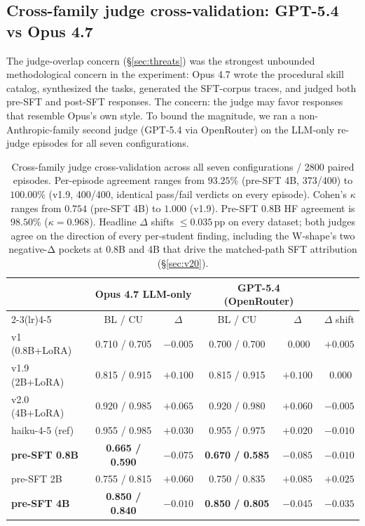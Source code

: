 \documentclass[10pt]{article}
\begin{document}
\subsection{Cross-family judge cross-validation: GPT-5.4 vs Opus 4.7}\label{sec:cross-family}

The judge-overlap concern (\S\ref{sec:threats}) was the strongest unbounded methodological concern in the experiment: Opus 4.7 wrote the procedural skill catalog, synthesized the tasks, generated the SFT-corpus traces, and judged both pre-SFT and post-SFT responses. The concern: the judge may favor responses that resemble Opus's own style. To bound the magnitude, we ran a non-Anthropic-family second judge (GPT-5.4 via OpenRouter) on the LLM-only re-judge episodes for all seven configurations.

\begin{table}[h]
\centering
\small
\begin{tabular}{@{}l c c c c c@{}}
\toprule
& \multicolumn{2}{c}{\textbf{Opus 4.7 LLM-only}} & \multicolumn{2}{c}{\textbf{GPT-5.4 (OpenRouter)}} & \\
\cmidrule(lr){2-3}\cmidrule(lr){4-5}
& BL / CU & $\Delta$ & BL / CU & $\Delta$ & $\Delta$ shift \\
\midrule
v1   (0.8B+LoRA)        & 0.710 / 0.705 & $-0.005$ & 0.700 / 0.700 & $\;0.000$ & $+0.005$ \\
v1.9 (2B+LoRA)          & 0.815 / 0.915 & $+0.100$ & 0.815 / 0.915 & $+0.100$ & $\;0.000$ \\
v2.0 (4B+LoRA)          & 0.920 / 0.985 & $+0.065$ & 0.920 / 0.980 & $+0.060$ & $-0.005$ \\
haiku-4-5 (ref)         & 0.955 / 0.985 & $+0.030$ & 0.955 / 0.975 & $+0.020$ & $-0.010$ \\
\textbf{pre-SFT 0.8B}   & \textbf{0.665 / 0.590} & $\boldsymbol{-0.075}$ & \textbf{0.670 / 0.585} & $\boldsymbol{-0.085}$ & $-0.010$ \\
pre-SFT 2B              & 0.755 / 0.815 & $+0.060$ & 0.750 / 0.835 & $+0.085$ & $+0.025$ \\
\textbf{pre-SFT 4B}     & \textbf{0.850 / 0.840} & $\boldsymbol{-0.010}$ & \textbf{0.850 / 0.805} & $\boldsymbol{-0.045}$ & $\boldsymbol{-0.035}$ \\
\bottomrule
\end{tabular}
\caption{Cross-family judge cross-validation across all seven configurations / 2800 paired episodes. Per-episode agreement ranges from $93.25\%$ (pre-SFT 4B, 373/400) to $100.00\%$ (v1.9, 400/400, identical pass/fail verdicts on every episode). Cohen's $\kappa$ ranges from $0.754$ (pre-SFT 4B) to $1.000$ (v1.9). Pre-SFT 0.8B HF agreement is $98.50\%$ ($\kappa{=}0.968$). Headline $\Delta$ shifts $\leq 0.035$\,pp on every dataset; both judges agree on the direction of every per-student finding, including the W-shape's two negative-Δ pockets at 0.8B and 4B that drive the matched-path SFT attribution (\S\ref{sec:v20}).}
\label{tab:cross-family}
\end{table}
\end{document}
